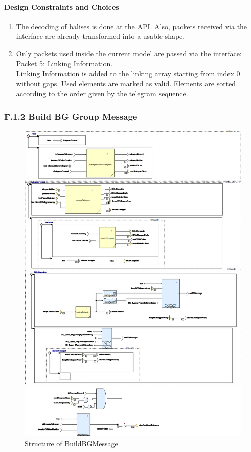 \documentclass{template/openetcs_report}
\begin{document}
\paragraph{Design Constraints and Choices}

\begin{enumerate}
\item The decoding of balises is done at the API. Also, packets received via the interface are already transformed into a usable shape.
\item Only packets used inside the current model are passed via the interface:\\
Packet 5: Linking Information.\\
Linking Information is added to the linking array starting from index 0 without gaps. Used elements are marked as valid. Elements are sorted according to the order given by the telegram sequence.
\end{enumerate}

\subsubsection{F.1.2 Build BG Group Message}

\begin{figure}[hbtp]
\centering
\includegraphics[width=\textwidth]{../images/BuildBGMessage_diagram.png}
\caption{Structure of BuildBGMessage}
\end{figure}
\end{document}
